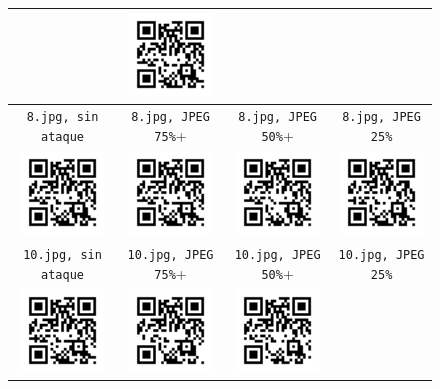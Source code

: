 \documentclass{rcci} %
\begin{document}
\begin{figure}[H]
\begin{center}
\begin{tabular}{|c|c|c|c|}
&\includegraphics[width=2.2cm]{2_jpeg_25}\\\hline
\verb+8.jpg, sin ataque+
&\verb+8.jpg, JPEG 75%+
&\verb+8.jpg, JPEG 50%+
&\verb+8.jpg, JPEG 25%+\\\hline
\includegraphics[width=2.2cm]{8_without_noise}
&\includegraphics[width=2.2cm]{8_jpeg_75}
&\includegraphics[width=2.2cm]{8_jpeg_50}
&\includegraphics[width=2.2cm]{8_jpeg_25}\\\hline
\verb+10.jpg, sin ataque+
&\verb+10.jpg, JPEG 75%+
&\verb+10.jpg, JPEG 50%+
&\verb+10.jpg, JPEG 25%+\\\hline
\includegraphics[width=2.2cm]{10_without_noise}
&\includegraphics[width=2.2cm]{10_jpeg_75}
&\includegraphics[width=2.2cm]{10_jpeg_50}

\end{tabular}
\end{center}
\end{figure}
\end{document}
